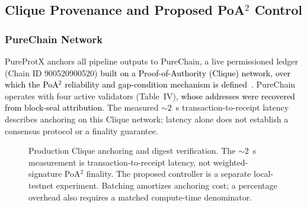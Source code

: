 \documentclass[conference]{IEEEtran}
\newcommand{\rev}[2]{#2}
\begin{document}
\subsection{\textbf{\rev{R1.2, R2.4}{Clique Provenance and Proposed PoA$^2$ Control}}}
\label{sec:blockchain}

\subsubsection{PureChain Network}

PureProtX anchors all pipeline outputs to PureChain, a
live permissioned ledger (Chain ID 900520900520)
\textcolor{black}{built on a Proof-of-Authority (Clique) network, over
which the PoA$^2$ reliability and gap-condition mechanism is
defined~\cite{kim2025proof, ajakwe2025ebctc}.}
PureChain operates with four active validators (Table~IV),
\textcolor{black}{whose addresses were recovered from block-seal
attribution.} \rev{R2.4}{The measured ${\sim}2$~s transaction-to-receipt
latency describes anchoring on this Clique network; latency alone
does not establish a consensus protocol or a finality guarantee.}

\begin{figure}[!t]
\centering
{}
\caption{\rev{R1.1, R1.2, R1.3, R1.4, R2.2, R2.4}{Production
Clique anchoring and digest verification. The ${\sim}2$~s
measurement is transaction-to-receipt latency, not weighted-signature
PoA$^2$ finality. The proposed controller is a separate local-testnet
experiment. Batching amortizes anchoring cost; a percentage overhead
also requires a matched compute-time denominator.}}

\label{fig:poa-provenance}
\end{figure}
\end{document}
